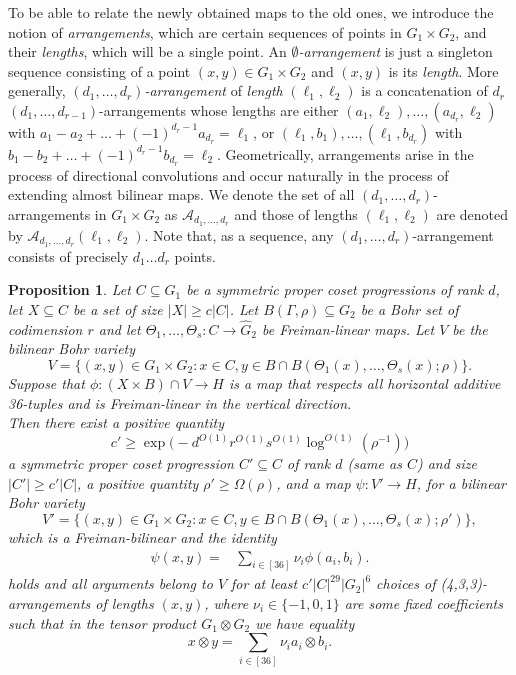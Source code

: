 \documentclass[a4paper,11pt]{article}
\numberwithin{theorem}{section}
\newtheorem{proposition}[theorem]{Proposition}
\theoremstyle{definition}
\begin{document}
To be able to relate the newly obtained maps to the old ones, we introduce the notion of \textit{arrangements}, which are certain sequences of points in $G_1 \times G_2$, and their \textit{lengths}, which will be a single point. An \textit{$\emptyset$-arrangement} is just a singleton sequence consisting of a point $(x,y) \in G_1 \times G_2$ and $(x,y)$ is its \textit{length}. More generally, \emph{$(d_1, \dots, d_r)$-arrangement} of \textit{length} $(\ell_1, \ell_2)$ is a concatenation of $d_r$ $(d_1, \dots, d_{r-1})$-arrangements whose lengths are either $(a_1, \ell_2), \dots, (a_{d_r}, \ell_2)$ with $a_1 - a_2 + \dots + (-1)^{d_r - 1}a_{d_r} = \ell_1$, or $(\ell_1, b_1), \dots, (\ell_1, b_{d_r})$ with $b_1 - b_2 + \dots + (-1)^{d_r - 1}b_{d_r} = \ell_2$. Geometrically, arrangements arise in the process of directional convolutions and occur naturally in the process of extending almost bilinear maps. We denote the set of all $(d_1, \dots, d_r)$-arrangements in $G_1 \times G_2$ as $\mathcal{A}_{d_1, \dots, d_r}$ and those of lengths $(\ell_1, \ell_2)$ are denoted by $\mathcal{A}_{d_1, \dots, d_r}(\ell_1, \ell_2)$. Note that, as a sequence, any  $(d_1, \dots, d_r)$-arrangement consists of precisely $d_1\dots d_r$ points.

\begin{proposition}\label{secondrobustBRstep}
    Let $C \subseteq G_1$ be a symmetric proper coset progressions of rank $d$, let $X \subseteq C$ be a set of size $|X| \geq c |C|$. Let $B(\Gamma, \rho) \subseteq G_2$ be a Bohr set of codimension $r$ and let $\Theta_1, \dots, \Theta_s : C \to \hat{G}_2$ be Freiman-linear maps. Let $V$ be the bilinear Bohr variety
    \[V = \Big\{(x,y) \in G_1 \times G_2 : x \in C, y \in B \cap B(\Theta_1(x), \dots, \Theta_s(x); \rho)\Big\}.\]
    Suppose that $\phi : (X \times B) \cap V \to H$ is a map that respects all horizontal additive 36-tuples and is Freiman-linear in the vertical direction. \\
    \indent Then there exist a positive quantity
    \[c' \geq \exp\Big(-d^{O(1)} r^{O(1)} s^{O(1)} \log^{O(1)}(\rho^{-1}) \Big)\]
    a symmetric proper coset progression $C' \subseteq C$ of rank $d$ (same as $C$) and size $|C'| \geq c'|C|$, a positive quantity $\rho' \geq \Omega(\rho)$, and a map $\psi : V' \to H$, for a bilinear Bohr variety
    \[V' = \Big\{(x,y) \in G_1 \times G_2 : x \in C, y \in B \cap B(\Theta_1(x), \dots, \Theta_s(x); \rho')\Big\},\]
    which is a Freiman-bilinear and the identity 
    \begin{align}
    \psi(x,y)= & \sum_{i \in [36]} \nu_i \phi(a_i, b_i).\label{extensionvarid}
    \end{align}
    holds and all arguments belong to $V$ for at least $c'|C|^{29} |G_2|^6$ choices of (4,3,3)-arrangements of lengths $(x,y)$, where $\nu_i \in \{-1,0,1\}$ are some fixed coefficients such that in the tensor product $G_1 \otimes G_2$ we have equality 
    \[x \otimes y =  \sum_{i \in [36]} \nu_i a_i \otimes b_i.\]
\end{proposition}
\end{document}
